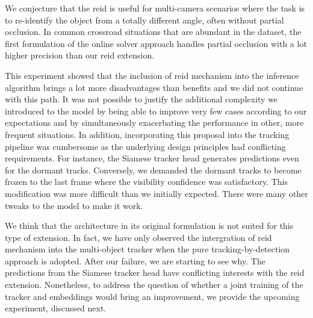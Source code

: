 We conjecture that the \gls{reid} is useful for multi-camera scenarios where the task is to re-identify the object from a totally different angle, often without partial occlusion. In common crossroad situations that are abundant in the \uadetrac{} dataset, the first formulation of the online solver approach handles partial occlusion with a lot higher precision than our \gls{reid} extension.

This experiment showed that the inclusion of \gls{reid} mechanism into the inference algorithm brings a lot more disadvantages than benefits and we did not continue with this path. It was not possible to justify the additional complexity we introduced to the model by being able to improve very few cases according to our expectations and by simultaneously exacerbating the performance in other, more frequent situations. In addition, incorporating this proposal into the tracking pipeline was cumbersome as the underlying design principles had conflicting requirements. For instance, the Siamese tracker head generates predictions even for the dormant tracks. Conversely, we demanded the dormant tracks to become frozen to the last frame where the visibility confidence was satisfactory. This modification was more difficult than we initially expected. There were many other tweaks to the model to make it work.

We think that the architecture in its original formulation is not suited for this type of extension. In fact, we have only observed the intergration of \gls{reid} mechanism into the multi-object tracker when the pure tracking-by-detection approach is adopted. After our failure, we are starting to see why. The predictions from the Siamese tracker head have conflicting interests with the \gls{reid} extension. Nonetheless, to address the question of whether a joint training of the tracker and embeddings would bring an improvement, we provide the upcoming experiment, discussed next.
